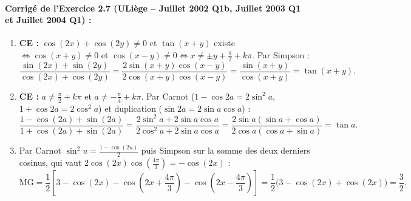 \paragraph{Corrigé de l'Exercice 2.7 (ULiège -- Juillet 2002 Q1b, Juillet 2003 Q1 et Juillet 2004 Q1) :}
\begin{enumerate}[label=(\alph*)]
    \item \textbf{CE :} $\cos(2x)+\cos(2y) \neq 0$ et $\tan(x+y)$ existe $\iff \cos(x+y) \neq 0$ et $\cos(x-y) \neq 0 \iff x \neq \pm y + \frac{\pi}{2} + k\pi$. Par Simpson :
    \[
        \frac{\sin(2x) + \sin(2y)}{\cos(2x) + \cos(2y)} = \frac{2\sin(x+y)\cos(x-y)}{2\cos(x+y)\cos(x-y)} = \frac{\sin(x+y)}{\cos(x+y)} = \tan(x+y).
    \]
    \item \textbf{CE :} $a \neq \frac{\pi}{2} + k\pi$ et $a \neq -\frac{\pi}{4} + k\pi$. Par Carnot ($1-\cos 2a = 2\sin^2 a$, $1+\cos 2a = 2\cos^2 a$) et duplication ($\sin 2a = 2\sin a\cos a$) :
    \[
        \frac{1 - \cos(2a) + \sin(2a)}{1 + \cos(2a) + \sin(2a)} = \frac{2\sin^2 a + 2\sin a\cos a}{2\cos^2 a + 2\sin a\cos a} = \frac{2\sin a(\sin a + \cos a)}{2\cos a(\cos a + \sin a)} = \tan a.
    \]
    \item Par Carnot $\sin^2 u = \frac{1-\cos(2u)}{2}$ puis Simpson sur la somme des deux derniers cosinus, qui vaut $2\cos(2x)\cos\left(\frac{4\pi}{3}\right) = -\cos(2x)$ :
    \[
        \text{MG} = \frac{1}{2}\left[3 - \cos(2x) - \cos\left(2x+\frac{4\pi}{3}\right) - \cos\left(2x-\frac{4\pi}{3}\right)\right] = \frac{1}{2}\bigl(3 - \cos(2x) + \cos(2x)\bigr) = \frac{3}{2}.
    \]
\end{enumerate}


